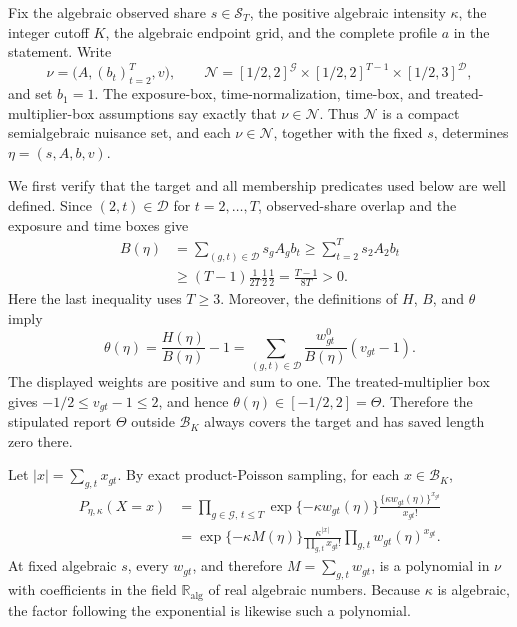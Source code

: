 Fix the algebraic observed share \(s\in\mathcal S_T\), the positive algebraic intensity \(\kappa\), the integer cutoff \(K\), the algebraic endpoint grid, and the complete profile \(a\) in the statement.  Write
\[
 \nu=\bigl(A,(b_t)_{t=2}^T,v\bigr),
 \qquad
 \mathcal N=[1/2,2]^{\mathcal G}\times[1/2,2]^{T-1}
                    \times[1/2,3]^{\mathcal D},
\]
and set \(b_1=1\).  The exposure-box, time-normalization, time-box, and treated-multiplier-box assumptions say exactly that \(\nu\in\mathcal N\).  Thus \(\mathcal N\) is a compact semialgebraic nuisance set, and each \(\nu\in\mathcal N\), together with the fixed \(s\), determines \(\eta=(s,A,b,v)\).

We first verify that the target and all membership predicates used below are well defined.  Since \((2,t)\in\mathcal D\) for \(t=2,\ldots,T\), observed-share overlap and the exposure and time boxes give
\[
\begin{aligned}
B(\eta)
 &=\sum_{(g,t)\in\mathcal D}s_gA_gb_t
 \ge \sum_{t=2}^T s_2A_2b_t                                      \\
 &\ge (T-1)\frac{1}{2T}\frac12\frac12
 =\frac{T-1}{8T}>0.
\end{aligned}
\]
Here the last inequality uses \(T\ge3\).  Moreover, the definitions of \(H\), \(B\), and \(\theta\) imply
\[
 \theta(\eta)
 =\frac{H(\eta)}{B(\eta)}-1
 =\sum_{(g,t)\in\mathcal D}
   \frac{w^0_{gt}}{B(\eta)}(v_{gt}-1).
\]
The displayed weights are positive and sum to one.  The treated-multiplier box gives \(-1/2\le v_{gt}-1\le2\), and hence \(\theta(\eta)\in[-1/2,2]=\Theta\).  Therefore the stipulated report \(\Theta\) outside \(\mathcal B_K\) always covers the target and has saved length zero there.

Let \(|x|=\sum_{g,t}x_{gt}\).  By exact product-Poisson sampling, for each \(x\in\mathcal B_K\),
\[
\begin{aligned}
P_{\eta,\kappa}(X=x)
 &=\prod_{g\in\mathcal G,\,t\le T}
   \exp\{-\kappa w_{gt}(\eta)\}
   \frac{\{\kappa w_{gt}(\eta)\}^{x_{gt}}}{x_{gt}!}             \\
 &=\exp\{-\kappa M(\eta)\}
   \frac{\kappa^{|x|}}{\prod_{g,t}x_{gt}!}
   \prod_{g,t}w_{gt}(\eta)^{x_{gt}}.
\end{aligned}
\]
At fixed algebraic \(s\), every \(w_{gt}\), and therefore \(M=\sum_{g,t}w_{gt}\), is a polynomial in \(\nu\) with coefficients in the field \(\mathbb R_{\mathrm{alg}}\) of real algebraic numbers.  Because \(\kappa\) is algebraic, the factor following the exponential is likewise such a polynomial.

